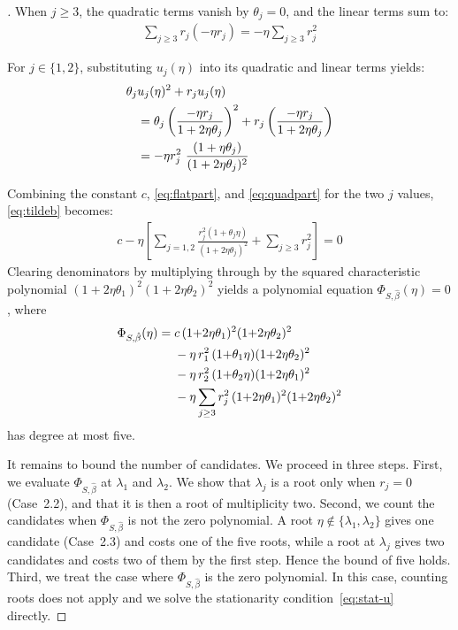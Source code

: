 \documentclass[11pt]{article}
\begin{document}
\begin{proof}[]
When $j \ge 3$, the quadratic terms vanish by $\theta_j = 0$, and the linear terms sum to:
\begin{align}
    \sum_{j \ge 3} {r}_j(-\eta {r}_j) = -\eta \sum_{j \ge 3} {r}_j^2\label{eq:flatpart}
\end{align}

For $j \in \{1,2\}$, substituting $u_j(\eta)$ into its quadratic and linear terms yields:
\begin{align}
    \theta_j &u_j(\eta)^2 + {r}_j u_j(\eta) \notag\\&= \theta_j \left(\frac{-\eta {r}_j}{1 + 2\eta\theta_j}\right)^2 + {r}_j \left(\frac{-\eta {r}_j}{1 + 2\eta\theta_j}\right) \\
    &= -\eta{r}_j^2\ \frac{ (1 + \eta\theta_j)}{(1 + 2\eta\theta_j)^2}\label{eq:quadpart}
\end{align}

Combining the constant $c$, \eqref{eq:flatpart}, and \eqref{eq:quadpart} for the two $j$ values, \eqref{eq:tildeb} becomes:
\begin{align}
    c - \eta \left[ \sum_{j=1,2} \frac{{r}_j^2 (1 + \theta_j \eta)}{(1 + 2\eta\theta_j)^2} + \sum_{j \ge 3} {r}_j^2 \right] = 0
\end{align}
Clearing denominators by multiplying through by the squared characteristic polynomial $(1+2\eta\theta_1)^2(1+2\eta\theta_2)^2$ yields a polynomial equation $\Phi_{S,\hat\beta}(\eta)=0$, where
\begin{align}
    \Phi_{S,\hat\beta}(\eta) = \;& c\,(1{+}2\eta\theta_1)^2(1{+}2\eta\theta_2)^2 \notag\\
    &- \eta\, {r}_1^2\,(1{+}\theta_1\eta)(1{+}2\eta\theta_2)^2 \notag\\
    &- \eta\, {r}_2^2\,(1{+}\theta_2\eta)(1{+}2\eta\theta_1)^2 \notag\\
    &- \eta \sum_{j \ge 3} {r}_j^2\,(1{+}2\eta\theta_1)^2(1{+}2\eta\theta_2)^2 \label{eq:phidef}
\end{align}
has degree at most five.

It remains to bound the number of candidates. We proceed in three steps. First, we evaluate $\Phi_{S,\hat\beta}$ at $\lambda_1$ and $\lambda_2$. We show that $\lambda_j$ is a root only when ${r}_j = 0$ (Case~2.2), and that it is then a root of multiplicity two. Second, we count the candidates when $\Phi_{S,\hat\beta}$ is not the zero polynomial. A root $\eta \notin \{\lambda_1,\lambda_2\}$ gives one candidate (Case~2.3) and costs one of the five roots, while a root at $\lambda_j$ gives two candidates and costs two of them by the first step. Hence the bound of five holds. Third, we treat the case where $\Phi_{S,\hat\beta}$ is the zero polynomial. In this case, counting roots does not apply and we solve the stationarity condition~\eqref{eq:stat-u} directly.


\end{proof}
\end{document}
